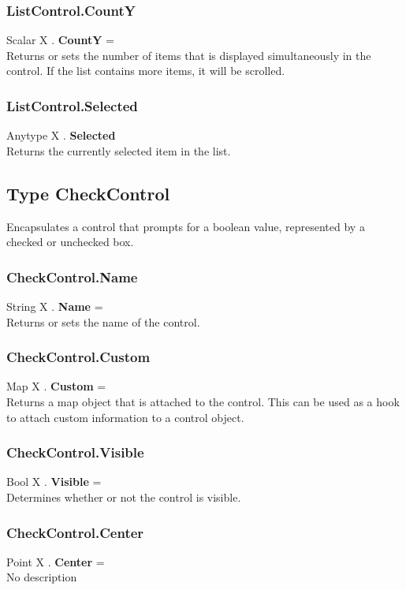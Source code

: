 \subsubsection{ListControl.CountY \label{F:ListControl:CountY}}
Scalar X . \textbf{CountY} = \\
Returns or sets the number of items that is displayed simultaneously in the control. If the list contains more items, it will be scrolled.

\subsubsection{ListControl.Selected \label{F:ListControl:Selected}}
Anytype X . \textbf{Selected} \\
Returns the currently selected item in the list.

\subsection{Type CheckControl \label{T:CheckControl}}
Encapsulates a control that prompts for a boolean value, represented by a checked or unchecked box.

\subsubsection{CheckControl.Name \label{F:CheckControl:Name}}
String X . \textbf{Name} = \\
Returns or sets the name of the control.

\subsubsection{CheckControl.Custom \label{F:CheckControl:Custom}}
Map X . \textbf{Custom} = \\
Returns a map object that is attached to the control. This can be used as a hook to attach custom information to a control object.

\subsubsection{CheckControl.Visible \label{F:CheckControl:Visible}}
Bool X . \textbf{Visible} = \\
Determines whether or not the control is visible.

\subsubsection{CheckControl.Center \label{F:CheckControl:Center}}
Point X . \textbf{Center} = \\
No description

